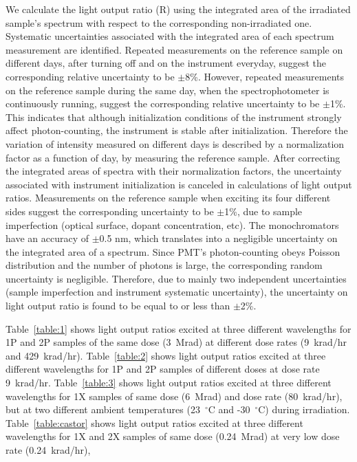 \documentclass[review]{elsarticle}
\begin{document}
We calculate the light output ratio (R) using the integrated area of the irradiated sample's spectrum 
with respect to the corresponding non-irradiated one. 
Systematic uncertainties associated with the integrated area of each spectrum measurement are identified. 
Repeated measurements on the reference sample on different days, after turning off and on the instrument everyday, 
suggest the corresponding relative uncertainty to be $\pm$8\%. 
However, repeated measurements on the reference sample during the same day, when the spectrophotometer is continuously running, 
suggest the corresponding relative uncertainty to be $\pm$1\%. 
This indicates that although initialization conditions of the instrument strongly affect photon-counting, 
the instrument is stable after initialization.
Therefore the variation of intensity measured on different days is described by a normalization factor as a function of day, 
by measuring the reference sample. 
After correcting the integrated areas of spectra with their normalization factors, 
the uncertainty associated with instrument initialization is canceled in calculations of light output ratios. 
Measurements on the reference sample when exciting its four different sides suggest the corresponding uncertainty to be $\pm$1\%, 
due to sample imperfection (optical surface, dopant concentration, etc). 
The monochromators have an accuracy of $\pm$0.5 nm, which translates into a negligible uncertainty on the integrated area of a spectrum. 
Since PMT's photon-counting obeys Poisson distribution and the number of photons is large, 
the corresponding random uncertainty is negligible. 
Therefore, due to mainly two independent uncertainties (sample imperfection and instrument systematic uncertainty), 
the uncertainty on light output ratio is found to be equal to or less than $\pm$2\%.

Table~\ref{table:1} shows light output ratios excited at three different wavelengths for 
1P and 2P samples of the same dose (3~Mrad) at different dose rates (9~krad/hr and 429~krad/hr). 
Table~\ref{table:2} shows light output ratios excited at three different wavelengths for 
1P and 2P samples of different doses at dose rate 9~krad/hr. 
Table~\ref{table:3} shows light output ratios excited at three different wavelengths for 
1X samples of same dose (6~Mrad) and dose rate (80~krad/hr), 
but at two different ambient temperatures (23~$^\circ$C and -30~$^\circ$C) during irradiation. 
Table~\ref{table:castor} shows light output ratios excited at three different wavelengths for 
1X and 2X samples of same dose (0.24~Mrad) at very low dose rate (0.24~krad/hr), 
\end{document}

